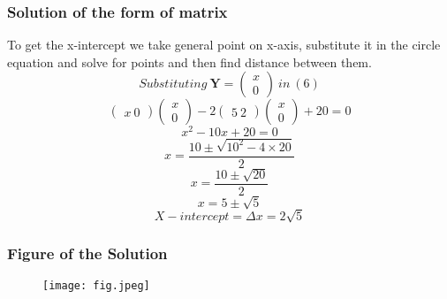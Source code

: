 \documentclass{beamer}
\begin{document}
\begin{frame}
\frametitle{Solution of the form of matrix}
To get the x-intercept we take general point on x-axis, substitute it in the circle equation and solve for points and then find distance between them.
$$ Substituting \ \textbf{Y} = \begin{pmatrix}x\\ 0 \end{pmatrix} \ in \ (6) $$
$$\begin{pmatrix}x\ 0 \end{pmatrix}\begin{pmatrix}x\\ 0 \end{pmatrix} - 2\begin{pmatrix}5\ 2 \end{pmatrix}\begin{pmatrix}x\\ 0 \end{pmatrix} + 20 = 0 $$
$$ x^2 -10x + 20 = 0 $$
$$ x = \frac{10\pm\sqrt{10^2-4\times20}}{2} $$
$$ x = \frac{10\pm\sqrt{20}}{2} $$
$$ x = 5 \pm \sqrt{5} $$
$$ X-intercept = \Delta{x} = 2\sqrt{5} $$
\end{frame}
 
\begin{frame}
\frametitle{Figure of the Solution}
\begin{figure}
\texttt{[image: fig.jpeg]}
\end{figure}
\end{frame}
 
\end{document}
